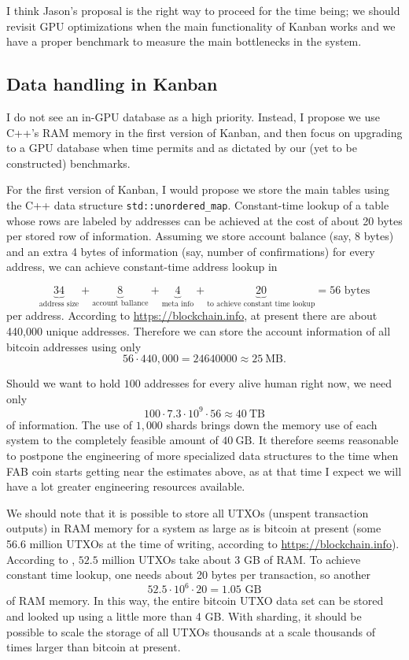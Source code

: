 \documentclass{article}
\begin{document}
I think Jason's proposal is the right way to proceed for the time being; we should revisit GPU optimizations when the main functionality of Kanban works and we have a proper benchmark to measure the main bottlenecks in the system. 

\subsection{Data handling in Kanban}
I do not see an in-GPU database as a high priority. Instead, I propose we use C++'s RAM memory in the first version of Kanban, and then focus on upgrading to a GPU database when time permits and as dictated by our (yet to be constructed) benchmarks. 

For the first version of Kanban, I would propose we store the main tables using the C++ data structure \verb|std::unordered_map|. Constant-time lookup of a table whose rows are labeled by addresses can be achieved at the cost of about 20 bytes per stored row of information. Assuming we store account balance (say, 8 bytes) and an extra 4 bytes of information (say, number of confirmations) for every address, we can achieve constant-time address lookup in 

\[
\underbrace{34}_{\text{address size}} + \underbrace{8}_{\text{account ballance}} + \underbrace{4}_{\text{meta info}} + \underbrace{20}_{\text{to achieve constant time lookup}} = 56 \text{ bytes}
\]
per address. According to \url{https://blockchain.info}, at present there are about 440,000 unique addresses. Therefore we can store the account information of all bitcoin addresses using only
\[
56\cdot 440,000 = 24640000 \approx 25~\text{MB}.
\]

Should we want to hold $100$ addresses for every alive human right now, we need only 
\[
100\cdot 7.3 \cdot 10^9 \cdot 56 \approx 40~\text{TB} 
\]
of information. The use of $1,000$ shards brings down the memory use of each system to the completely feasible amount of $40~\text{GB}$. It therefore seems reasonable to postpone the engineering of more specialized data structures to the time when FAB coin starts getting near the estimates above, as at that time I expect we will have a lot greater engineering resources available.


We should note that it is possible to store all UTXOs (unspent transaction outputs) in RAM memory for a system as large as is bitcoin at present (some 56.6 million UTXOs at the time of writing, according to \url{https://blockchain.info}). According to \cite{cryptoeprint:2017:analysisofbitcoinUTXOs}, $52.5$ million UTXOs take about $3$ GB of RAM. To achieve constant time lookup, one needs about 20 bytes per transaction, so another 
\[
52.5 \cdot 10^6 \cdot 20 = 1.05\text{~GB}
\]
of RAM memory. In this way, the entire bitcoin UTXO data set can be stored and looked up using a little more than 4 GB. With sharding, it should be possible to scale the storage of all UTXOs thousands at a scale thousands of times larger than bitcoin at present.
\newpage




\end{document}
